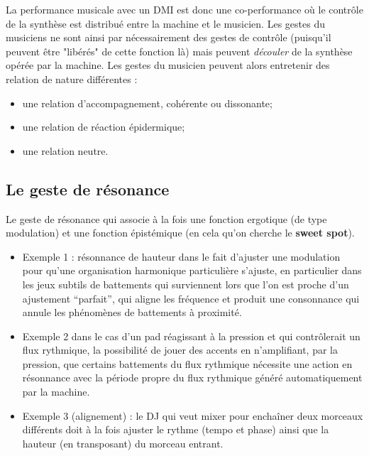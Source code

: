  La performance musicale avec un \gls{DMI} est donc une co-performance où le contrôle de la synthèse est distribué entre la machine et le musicien. 
 Les gestes du musiciens ne sont ainsi par nécessairement des gestes de contrôle (puisqu'il peuvent être "libérés" de cette fonction là) mais peuvent \textit{découler} de la synthèse opérée par la machine. Les gestes du musicien peuvent alors entretenir des relation de nature différentes :

\vspace{-1em}
\begin{itemize}[noitemsep]
\item une relation d'accompagnement, cohérente ou dissonante;
\item une relation de réaction épidermique;
\item une relation neutre.
\end{itemize}
 
\subsection{Le geste de résonance}

Le geste de résonance qui associe à la fois une fonction ergotique (de type modulation) et une fonction épistémique (en cela qu'on cherche le \textbf{sweet spot}). 
\vspace{-1em}
\begin{itemize}[noitemsep]
\item Exemple 1 : résonnance de hauteur dans le fait d'ajuster une modulation pour qu'une organisation harmonique particulière s'ajuste, en particulier dans les jeux subtils de battements qui surviennent lors que l'on est proche d'un ajustement ``parfait'', qui aligne les fréquence et produit une consonnance qui annule les phénomènes de battements à proximité.
\item Exemple 2 dans le cas d'un pad réagissant à la pression et qui contrôlerait un flux rythmique, la possibilité de jouer des accents en n'amplifiant, par la pression, que certains battements du flux rythmique nécessite une action en résonnance avec la période propre du flux rythmique généré automatiquement par la machine.
\item Exemple 3 (alignement) : le DJ qui veut mixer pour enchaîner deux morceaux différents doit à la fois ajuster le rythme (tempo et phase) ainsi que la hauteur (en transposant) du morceau entrant.
\end{itemize}

